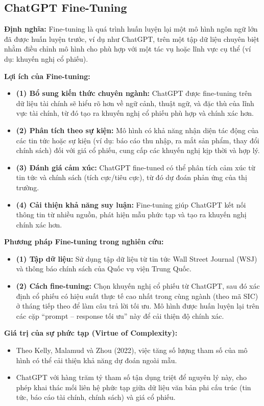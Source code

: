 \documentclass[a4paper,12pt]{article}
\begin{document}
\subsection{ChatGPT Fine-Tuning}

\noindent
\textbf{Định nghĩa:}  
Fine-tuning là quá trình huấn luyện lại một mô hình ngôn ngữ lớn đã được huấn luyện trước, ví dụ như ChatGPT, trên một tập dữ liệu chuyên biệt nhằm điều chỉnh mô hình cho phù hợp với một tác vụ hoặc lĩnh vực cụ thể (ví dụ: khuyến nghị cổ phiếu).

\noindent
\textbf{Lợi ích của Fine-tuning:}
\begin{itemize}
    \item \textbf{(1) Bổ sung kiến thức chuyên ngành:} ChatGPT được fine-tuning trên dữ liệu tài chính sẽ hiểu rõ hơn về ngữ cảnh, thuật ngữ, và đặc thù của lĩnh vực tài chính, từ đó tạo ra khuyến nghị cổ phiếu phù hợp và chính xác hơn.
    \item \textbf{(2) Phân tích theo sự kiện:} Mô hình có khả năng nhận diện tác động của các tin tức hoặc sự kiện (ví dụ: báo cáo thu nhập, ra mắt sản phẩm, thay đổi chính sách) đối với giá cổ phiếu, cung cấp các khuyến nghị kịp thời và hợp lý.
    \item \textbf{(3) Đánh giá cảm xúc:} ChatGPT fine-tuned có thể phân tích cảm xúc từ tin tức và chính sách (tích cực/tiêu cực), từ đó dự đoán phản ứng của thị trường.
    \item \textbf{(4) Cải thiện khả năng suy luận:} Fine-tuning giúp ChatGPT kết nối thông tin từ nhiều nguồn, phát hiện mẫu phức tạp và tạo ra khuyến nghị chính xác hơn.
\end{itemize}

\noindent
\textbf{Phương pháp Fine-tuning trong nghiên cứu:}
\begin{itemize}
    \item \textbf{(1) Tập dữ liệu:} Sử dụng tập dữ liệu từ tin tức Wall Street Journal (WSJ) và thông báo chính sách của Quốc vụ viện Trung Quốc.
    \item \textbf{(2) Cách fine-tuning:} Chọn khuyến nghị cổ phiếu từ ChatGPT, sau đó xác định cổ phiếu có hiệu suất thực tế cao nhất trong cùng ngành (theo mã SIC) ở tháng tiếp theo để làm câu trả lời tối ưu. Mô hình được huấn luyện lại trên các cặp “prompt – response tối ưu” này để cải thiện độ chính xác.
\end{itemize}

\noindent
\textbf{Giá trị của sự phức tạp (Virtue of Complexity):}
\begin{itemize}
    \item Theo Kelly, Malamud và Zhou (2022), việc tăng số lượng tham số của mô hình có thể cải thiện khả năng dự đoán ngoài mẫu.
    \item ChatGPT với hàng trăm tỷ tham số tận dụng triệt để nguyên lý này, cho phép khai thác mối liên hệ phức tạp giữa dữ liệu văn bản phi cấu trúc (tin tức, báo cáo tài chính, chính sách) và giá cổ phiếu.
\end{itemize}
\end{document}
